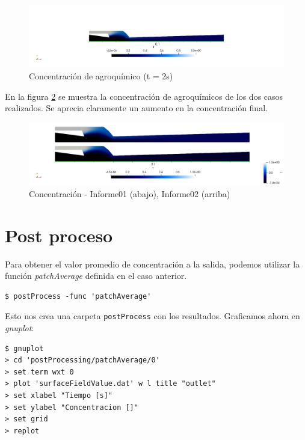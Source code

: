 \documentclass{article}
\begin{document}
\begin{figure}[h!]
	\centering
	\includegraphics[width=1\textwidth]{Figuras/06_campo_T.png}
	\caption{Concentración de agroquímico (t = 2s)}
	\label{fig:campo_t}
\end{figure}

En la figura \ref{fig:comp_t} se muestra la concentración de agroquímicos de los dos casos realizados. Se aprecia claramente un aumento en la concentración final.

\begin{figure}[h!]
	\centering
	\includegraphics[width=1\textwidth]{Figuras/06_comparacion_T.png}
	\caption{Concentración - Informe01 (abajo), Informe02 (arriba)}
	\label{fig:comp_t}
\end{figure}

\newpage
\section{Post proceso}
Para obtener el valor promedio de concentración a la salida, podemos utilizar la función \textit{patchAverage} definida en el caso anterior.

\begin{lstlisting}
$ postProcess -func 'patchAverage'
\end{lstlisting}

Esto nos crea una carpeta \texttt{postProcess} con los resultados. Graficamos ahora en \textit{gnuplot}:

\begin{lstlisting}
$ gnuplot
> cd 'postProcessing/patchAverage/0'
> set term wxt 0
> plot 'surfaceFieldValue.dat' w l title "outlet"
> set xlabel "Tiempo [s]"
> set ylabel "Concentracion []"
> set grid
> replot
\end{lstlisting}
\end{document}
